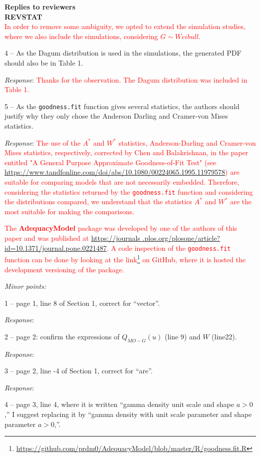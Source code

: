 \documentclass[version=last,12pt,{"maintainersDelight"},letterpaper,]{scrlttr2}
\renewcommand{\href}[2]{#2\footnote{\url{#1}}}
\begin{document}
\begin{letter}{\textbf{Replies to reviewers}\\\textbf{REVSTAT}\\}
\textcolor{red}{In order to remove some ambiguity, we opted to extend the simulation studies, where we also include the simulations, considering $G\sim Weibull$.}

4 -- As the Dagum distribution is used in the simulations, the generated
PDF should also be in Table 1.

\emph{Response}:
\textcolor{red}{Thanks for the observation. The Dagum distribution was included in Table 1.}

5 -- As the \texttt{goodness.fit} function gives several statistics, the
authors should justify why they only chose the Anderson Darling and
Cramer-von Mises statistics.

\emph{Response}:
\textcolor{red}{The use of the $A^*$ and $W^*$ statistics, Anderson-Darling and Cramer-von Mises statistics, respectively, corrected by Chen and Balakrishnan, in the paper entitled "A General Purpose Approximate Goodness-of-Fit Test" (see   \url{https://www.tandfonline.com/doi/abs/10.1080/00224065.1995.11979578}) are suitable for comparing models that are not necessarily embedded. Therefore, considering the statistics returned by the \texttt{goodness.fit} function and considering the distributions compared, we understand that the statistics $A^*$ and $W^*$ are the most suitable for making the comparisons.}

\textcolor{red}{The  \textbf{AdequacyModel} package was developed by one of the authors of this paper and was published at   \url{https://journals .plos.org/plosone/article?id=10.1371/journal.pone.0221487}. A code inspection of the \texttt{goodness.fit} function can be done by looking at the   \href{https://github.com/prdm0/AdequacyModel/blob/master/R/goodness.fit.R}{link} on GitHub, where it is hosted the development versioning of the package.}

\emph{Minor points:}

1 -- page 1, line 8 of Section 1, correct for ``vector''.

\emph{Response}:

2 -- page 2: confirm the expressions of \(Q_{MO-G}(u)\) (line 9) and
\(W\) (line22).

\emph{Response}:

3 -- page 2, line -4 of Section 1, correct for ``are''.

\emph{Response}:

4 -- page 3, line 4, where it is written ``gamma density unit scale and
shape \(a>0\),'' I suggest replacing it by ``gamma density with unit
scale parameter and shape parameter \(a>0\),''.


\end{letter}
\end{document}
